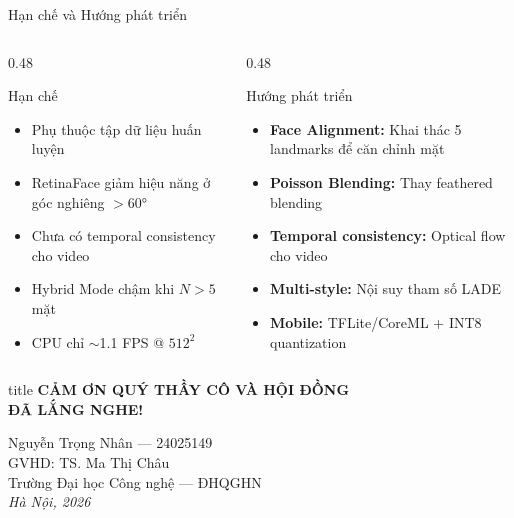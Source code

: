 \documentclass[aspectratio=169,12pt]{beamer}
\begin{document}
\begin{frame}{Hạn chế và Hướng phát triển}
\begin{columns}[T]
\begin{column}{0.48\textwidth}
\begin{alertblock}{Hạn chế}
\small
\begin{itemize}
    \item Phụ thuộc tập dữ liệu huấn luyện
    \item RetinaFace giảm hiệu năng ở góc nghiêng $>60°$
    \item Chưa có temporal consistency cho video
    \item Hybrid Mode chậm khi $N > 5$ mặt
    \item CPU chỉ $\sim$1.1 FPS @ $512^2$
\end{itemize}
\end{alertblock}
\end{column}
\begin{column}{0.48\textwidth}
\begin{exampleblock}{Hướng phát triển}
\small
\begin{itemize}
    \item \textbf{Face Alignment:} Khai thác 5 landmarks để căn chỉnh mặt
    \item \textbf{Poisson Blending:} Thay feathered blending
    \item \textbf{Temporal consistency:} Optical flow cho video
    \item \textbf{Multi-style:} Nội suy tham số LADE
    \item \textbf{Mobile:} TFLite/CoreML + INT8 quantization
\end{itemize}
\end{exampleblock}
\end{column}
\end{columns}
\end{frame}

{
\begin{frame}
\vfill
\centering
\begin{beamercolorbox}[sep=12pt,center,shadow=true,rounded=true]{title}
{\Large \textbf{CẢM ƠN QUÝ THẦY CÔ VÀ HỘI ĐỒNG\\[0.3cm] ĐÃ LẮNG NGHE!}}
\end{beamercolorbox}

\vspace{0.8cm}

{\large Nguyễn Trọng Nhân --- 24025149}\\[0.2cm]
{\normalsize GVHD: TS. Ma Thị Châu}\\[0.2cm]
{\normalsize Trường Đại học Công nghệ --- ĐHQGHN}\\[0.5cm]

{\normalsize \textit{Hà Nội, 2026}}

\vfill
\end{frame}
}
\end{document}
